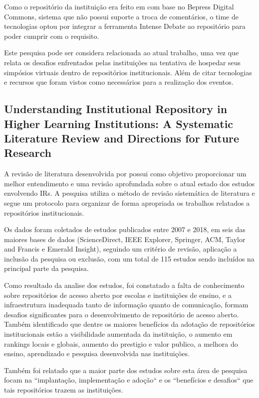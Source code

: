 Como o repositório da instituição era feito em com base no Bepress Digital
Commons, sistema que não possui suporte a troca de comentários, o time de
tecnologias optou por integrar a ferramenta Intense Debate ao repositório
para poder cumprir com o requisito.

Este pesquisa pode ser considera relacionada ao atual trabalho, uma vez
que relata os desafios enfrentados pelas instituições na tentativa de
hospedar seus simpósios virtuais dentro de repositórios institucionais.
Além de citar tecnologias e recursos que foram vistos como necessários
para a realização dos eventos.

\subsection{Understanding Institutional Repository in Higher Learning Institutions: A Systematic Literature Review and Directions for Future Research}

A revisão de literatura desenvolvida por \cite{2019:Asadi} possui como objetivo
proporcionar um melhor entendimento e uma revisão aprofundada sobre o atual estado
dos estudos envolvendo IRs. A pesquisa utiliza o método de revisão sistemática
de literatura e segue um protocolo para organizar de forma apropriada os
trabalhos relatados a repositórios institucionais.

Os dados foram coletados de estudos publicados entre 2007 e 2018, em
seis das maiores bases de dados (ScienceDirect, IEEE Explorer, Springer, ACM,
Taylor and Francis e Emerald Insight), seguindo um critério de revisão, aplicação
a inclusão da pesquisa ou exclusão, com um total de 115 estudos sendo
incluídos na principal parte da pesquisa.

Como resultado da analise dos estudos, foi constatado a falta de conhecimento
sobre repositórios de acesso aberto por escolas e instituições de ensino, e
a infraestrutura inadequada tanto de informação quanto de comunicação, formam
desafios significantes para o desenvolvimento de repositório de acesso aberto.
Também identificado que dentre os maiores benefícios da adotação de repositórios
institucionais estão a visibilidade aumentada da instituição, o aumento em
rankings locais e globais, aumento do prestigio e valor publico, a melhora do
ensino, aprendizado e pesquisa desenvolvida nas instituições.

Também foi relatado que a maior parte dos estudos sobre esta área de pesquisa
focam na ``implantação, implementação e adoção`` e os ``benefícios e desafios``
que tais repositórios trazem as instituições.

